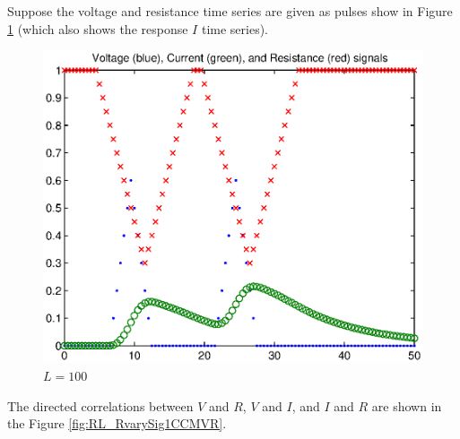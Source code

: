 \documentclass[a4paper,11pt]{article}
\begin{document}
Suppose the voltage and resistance time series are given as pulses show in Figure \ref{fig:RL_RvarySig1} (which also shows the response $I$ time series).
\begin{figure}[h!t]
\centering
\label{fig:RL_RvarySig1}
\includegraphics[scale=1]{graphics/RL_RvarySig1.eps}
\caption{$L = 100$}
\end{figure}
The directed correlations between $V$ and $R$, $V$ and $I$, and $I$ and $R$ are shown in the Figure \ref{fig:RL_RvarySig1CCMVR}.
\end{document}
